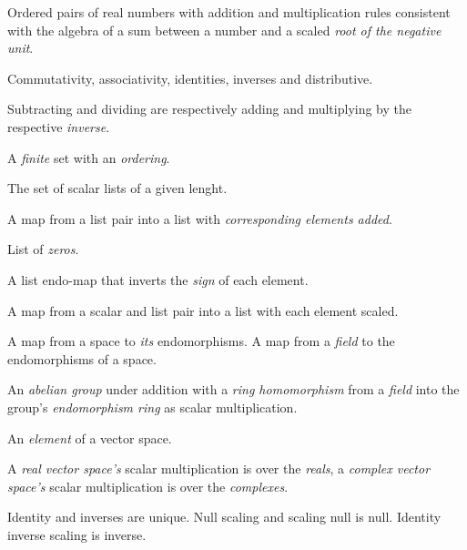 \pagebreak


\begin{multicols}{3}

  Ordered pairs of real numbers with addition and multiplication rules consistent with
  the algebra of a sum between a number and a scaled \textit{root of the negative unit}.

  Commutativity, associativity, identities, inverses and distributive.

  Subtracting and dividing are respectively adding and multiplying by the respective \textit{inverse}.

  A \textit{finite} set with an \textit{ordering}.

  The set of scalar lists of a given lenght.

  A map from a list pair into a list with \textit{corresponding elements added}.

  List of \textit{zeros}.

  A list endo-map that inverts the \textit{sign} of each element.

  A map from a scalar and list pair into a list with each element scaled.

  A map from a space to \textit{its} endomorphisms.
  A map from a \textit{field} to the endomorphisms of a space.

  An \textit{abelian group} under addition with a \textit{ring homomorphism} from a \textit{field} into the group's \textit{endomorphism ring} as scalar multiplication.

  An \textit{element} of a vector space.

  A \textit{real vector space's} scalar multiplication is over the \textit{reals},
  a \textit{complex vector space's} scalar multiplication is over the \textit{complexes}.

  Identity and inverses are unique. Null scaling and scaling null is null. Identity inverse scaling is inverse.


\end{multicols}
